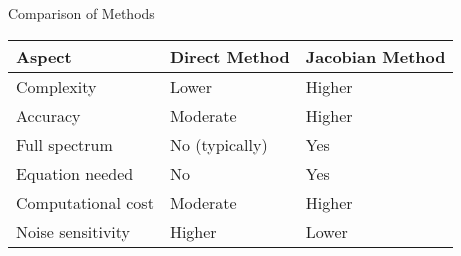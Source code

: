\documentclass{beamer}
\begin{document}
\begin{frame}{Comparison of Methods}
\begin{table}
\begin{tabular}{|l|l|l|}
\hline
\textbf{Aspect} & \textbf{Direct Method} & \textbf{Jacobian Method} \\
\hline
Complexity & Lower & Higher \\
Accuracy & Moderate & Higher \\
Full spectrum & No (typically) & Yes \\
Equation needed & No & Yes \\
Computational cost & Moderate & Higher \\
Noise sensitivity & Higher & Lower \\
\hline
\end{tabular}
\end{table}
\end{frame}
\end{document}
